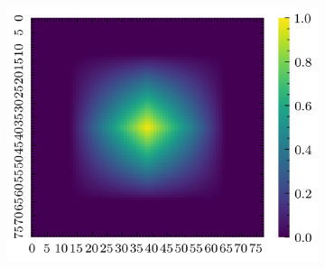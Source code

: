 \begin{figure}[H]
\begin{subfigure}[b]{0.19\textwidth}
        \includegraphics[width=\linewidth]{../img/5/quarry/best/grad-cam-2d-4.png}
    \end{subfigure}  


\end{figure}
